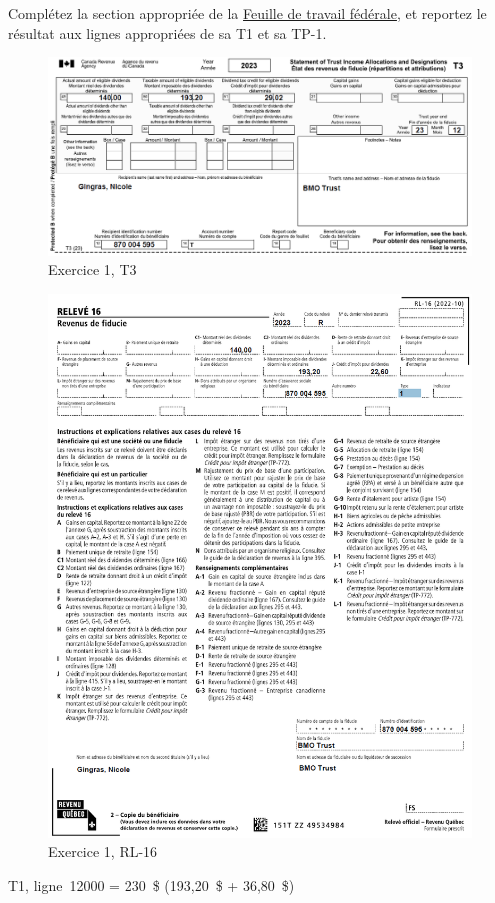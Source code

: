 \begin{question}
	Complétez la section appropriée de la \href{https://www.canada.ca/fr/agence-revenu/services/formulaires-publications/trousses-impot-toutes-annees-imposition/trousse-generale-impot-prestations/5000-d1.html}{Feuille de travail fédérale}, et reportez le résultat aux lignes appropriées de sa T1 et sa TP-1.
	\begin{figure}
		\centering
		\includegraphics[width=.9\textwidth]{exercice/6-1/Q2/T3.png}
		\caption[]{Exercice 1, T3}
		\label{fig:chap6Exercice1T3}
	\end{figure}
	\begin{figure}
		\centering
		\includegraphics[width=.9\textwidth]{exercice/6-1/Q2/RL16.png}
		\caption[]{Exercice 1, RL-16}
		\label{fig:chap6Exercice1RL16}
	\end{figure}
\end{question}
T1, ligne~12000 = 230~\$ (193,20~\$ + 36,80~\$)

